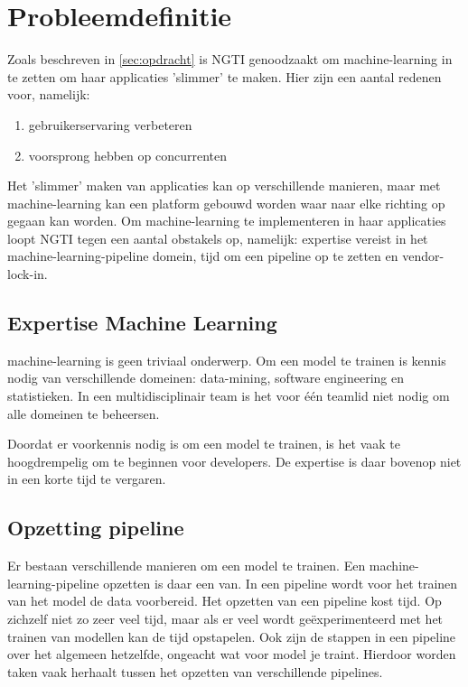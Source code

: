 
\section{Probleemdefinitie}\label{sec:probleemdefinitie}
Zoals beschreven in \autoref{sec:opdracht} is NGTI genoodzaakt om \gls{machine-learning} in te zetten om haar applicaties 'slimmer' te maken. Hier zijn een aantal redenen voor, namelijk:
\begin{enumerate}
  \item gebruikerservaring verbeteren
  \item voorsprong hebben op concurrenten
\end{enumerate}

Het 'slimmer' maken van applicaties kan op verschillende manieren, maar met \gls{machine-learning} kan een platform gebouwd worden waar naar elke richting op gegaan kan worden. Om \gls{machine-learning} te implementeren in haar applicaties loopt NGTI tegen een aantal obstakels op, namelijk: expertise vereist in het \gls{machine-learning-pipeline} domein, tijd om een pipeline op te zetten en \gls{vendor-lock-in}.

\subsection{Expertise Machine Learning}\label{sec:expertise-machine-learning}
\Gls{machine-learning} is geen triviaal onderwerp. Om een model te trainen is kennis nodig van verschillende domeinen: \gls{data-mining}, software engineering en statistieken. In een multidisciplinair team is het voor één teamlid niet nodig om alle domeinen te beheersen.

Doordat er voorkennis nodig is om een model te trainen, is het vaak te hoogdrempelig om te beginnen voor developers. De expertise is daar bovenop niet in een korte tijd te vergaren.

\subsection{Opzetting pipeline}\label{sec:opzetten-pipeline}
Er bestaan verschillende manieren om een model te trainen. Een \gls{machine-learning-pipeline} opzetten is daar een van. In een pipeline wordt voor het trainen van het model de data voorbereid. Het opzetten van een pipeline kost tijd. Op zichzelf niet zo zeer veel tijd, maar als er veel wordt geëxperimenteerd met het trainen van modellen kan de tijd opstapelen. Ook zijn de stappen in een pipeline over het algemeen hetzelfde, ongeacht wat voor model je traint. Hierdoor worden taken vaak herhaalt tussen het opzetten van verschillende pipelines.

